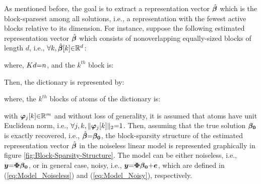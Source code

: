 As mentioned before, the goal is to extract a representation vector $\hat{\boldsymbol{\beta}}$ which is the block-sparsest among all solutions, i.e., a representation with the fewest active blocks relative to its dimension.
For instance, suppose the following estimated representation vector $\hat{\boldsymbol{\beta}}$ which consists of nonoverlapping equally-sized blocks of length $d$, i.e., $\forall k,\hat{\boldsymbol{\beta}}[k] {\in} \mathbb{R}^{d}$:

where, $Kd {=} n$, and the $k^{th}$ block is:

Then, the dictionary is represented by:

where, the $k^{th}$ blocks of atoms of the dictionary is:

with $\boldsymbol{\varphi}_{j}[k] {\in} \mathbb{R}^{m}$ and without loss of generality, it is assumed that atoms have unit Euclidean norm, i.e., $\forall j,k,  \Vert \boldsymbol{\varphi}_{j}[k] \Vert_2 {=} 1$.
Then, assuming that the true solution $\boldsymbol{\beta_0}$ is exactly recovered, i.e., $\hat{\boldsymbol{\beta}} {=} \boldsymbol{\beta_0}$, the block-sparsity structure of the estimated representation vector $\hat{\boldsymbol{\beta}}$ in the noiseless linear model is represented graphically in figure \ref{fig:Block-Sparsity-Structure}.
The model can be either noiseless, i.e., $\boldsymbol{y} {=} \boldsymbol{\Phi} \boldsymbol{\beta_0}$, or in general case, noisy, i.e., $\boldsymbol{y} {=} \boldsymbol{\Phi} \boldsymbol{\beta_0} {+} \boldsymbol{e}$, which are defined in (\ref{eq:Model_Noiseless}) and (\ref{eq:Model_Noisy}), respectively.

\FloatBarrier